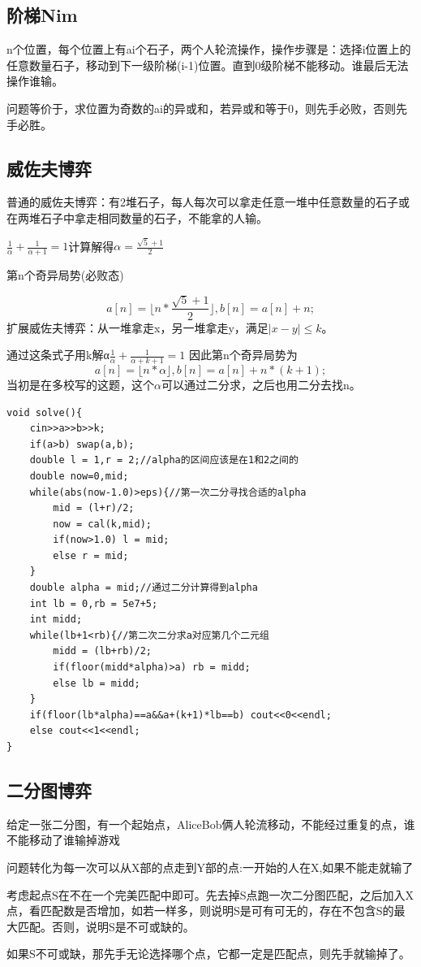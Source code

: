 \documentclass[a4]{ctexart}
\begin{document}
\subsection{阶梯Nim}
n个位置，每个位置上有ai个石子，两个人轮流操作，操作步骤是：选择i位置上的任意数量石子，移动到下一级阶梯(i-1)位置。直到0级阶梯不能移动。谁最后无法操作谁输。\par
问题等价于，求位置为奇数的ai的异或和，若异或和等于0，则先手必败，否则先手必胜。

\subsection{威佐夫博弈}
普通的威佐夫博弈：有2堆石子，每人每次可以拿走任意一堆中任意数量的石子或在两堆石子中拿走相同数量的石子，不能拿的人输。\par
$\frac{1}{\alpha}+\frac{1}{\alpha+1}=1$计算解得$\alpha =\frac{\sqrt{5}+1}{2}$\par
第n个奇异局势(必败态)\par
$$a[n]=\lfloor n*\frac{\sqrt{5}+1}{2}\rfloor,b[n]=a[n]+n;$$
扩展威佐夫博弈：从一堆拿走x，另一堆拿走y，满足$|x-y|\leq k$。\par
通过这条式子用k解α$\frac{1}{\alpha}+\frac{1}{\alpha +k+1}=1$
因此第n个奇异局势为
$$a[n]=\lfloor n*\alpha \rfloor,b[n]=a[n]+n*(k+1);$$
当初是在多校写的这题，这个$\alpha$可以通过二分求，之后也用二分去找n。
\begin{lstlisting}
void solve(){
    cin>>a>>b>>k;
    if(a>b) swap(a,b);
    double l = 1,r = 2;//alpha的区间应该是在1和2之间的 
    double now=0,mid;
    while(abs(now-1.0)>eps){//第一次二分寻找合适的alpha 
        mid = (l+r)/2;
        now = cal(k,mid);
        if(now>1.0) l = mid;
        else r = mid;
    }
    double alpha = mid;//通过二分计算得到alpha 
    int lb = 0,rb = 5e7+5;
    int midd;
    while(lb+1<rb){//第二次二分求a对应第几个二元组 
        midd = (lb+rb)/2;
        if(floor(midd*alpha)>a) rb = midd;
        else lb = midd;
    } 
    if(floor(lb*alpha)==a&&a+(k+1)*lb==b) cout<<0<<endl;
    else cout<<1<<endl;
}
\end{lstlisting}

\subsection{二分图博弈}
给定一张二分图，有一个起始点，AliceBob俩人轮流移动，不能经过重复的点，谁不能移动了谁输掉游戏\par
问题转化为每一次可以从X部的点走到Y部的点:一开始的人在X,如果不能走就输了\par
考虑起点S在不在一个完美匹配中即可。先去掉S点跑一次二分图匹配，之后加入X点，看匹配数是否增加，如若一样多，则说明S是可有可无的，存在不包含S的最大匹配。否则，说明S是不可或缺的。\par
如果S不可或缺，那先手无论选择哪个点，它都一定是匹配点，则先手就输掉了。
 
\end{document}
